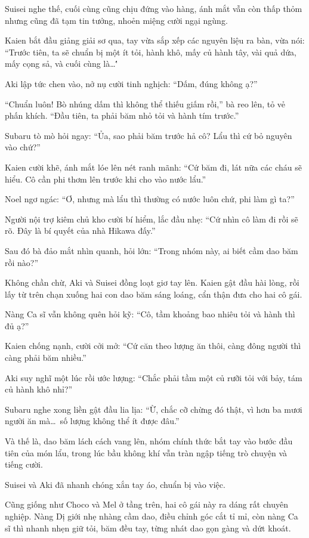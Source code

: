 \documentclass[../main.tex]{subfiles}
\begin{document}
Suisei nghe thế, cuối cùng cũng chịu đứng vào hàng, ánh mắt vẫn còn thấp thỏm nhưng cũng đã tạm tin tưởng, nhoẻn miệng cười ngại ngùng.

\ct

Kaien bắt đầu giảng giải sơ qua, tay vừa sắp xếp các nguyên liệu ra bàn, vừa nói: ``Trước tiên, ta sẽ chuẩn bị một ít tỏi, hành khô, mấy củ hành tây, vài quả dứa, mấy cọng sả, và cuối cùng là\dots\''

Aki lập tức chen vào, nở nụ cười tinh nghịch: ``Dấm, đúng không ạ?''

``Chuẩn luôn! Bò nhúng dấm thì không thể thiếu giấm rồi,'' bà reo lên, tỏ vẻ phấn khích. ``Đầu tiên, ta phải băm nhỏ tỏi và hành tím trước.''

Subaru tò mò hỏi ngay: ``Ủa, sao phải băm trước hả cô? Lẩu thì cứ bỏ nguyên vào chứ?''

Kaien cười khẽ, ánh mắt lóe lên nét ranh mãnh: ``Cứ băm đi, lát nữa các cháu sẽ hiểu. Cô cần phi thơm lên trước khi cho vào nước lẩu.''

Noel ngơ ngác: ``Ơ, nhưng mà lẩu thì thường có nước luôn chứ, phi làm gì ta?''

Người nội trợ kiêm chủ kho cười bí hiểm, lắc đầu nhẹ: ``Cứ nhìn cô làm đi rồi sẽ rõ. Đây là bí quyết của nhà Hikawa đấy.''

Sau đó bà đảo mắt nhìn quanh, hỏi lớn: ``Trong nhóm này, ai biết cầm dao băm rồi nào?''

Không chần chừ, Aki và Suisei đồng loạt giơ tay lên. Kaien gật đầu hài lòng, rồi lấy từ trên chạn xuống hai con dao băm sáng loáng, cẩn thận đưa cho hai cô gái.

Nàng Ca sĩ vẫn không quên hỏi kỹ: ``Cô, tầm khoảng bao nhiêu tỏi và hành thì đủ ạ?''

Kaien chống nạnh, cười cởi mở: ``Cứ căn theo lượng ăn thôi, càng đông người thì càng phải băm nhiều.''

Aki suy nghĩ một lúc rồi ước lượng: ``Chắc phải tầm một củ rưỡi tỏi với bảy, tám củ hành khô nhỉ?''

Subaru nghe xong liền gật đầu lia lịa: ``Ừ, chắc cỡ chừng đó thật, vì hơn ba mươi người ăn mà\dots\ số lượng không thể ít được đâu.''

Và thế là, dao băm lách cách vang lên, nhóm chính thức bắt tay vào bước đầu tiên của món lẩu, trong lúc bầu không khí vẫn tràn ngập tiếng trò chuyện và tiếng cười.

Suisei và Aki đã nhanh chóng xắn tay áo, chuẩn bị vào việc.

Cũng giống như Choco và Mel ở tầng trên, hai cô gái này ra dáng rất chuyên nghiệp. Nàng Dị giới nhẹ nhàng cầm dao, điều chỉnh góc cắt tỉ mỉ, còn nàng Ca sĩ thì nhanh nhẹn giữ tỏi, băm đều tay, từng nhát dao gọn gàng và dứt khoát.
\end{document}
